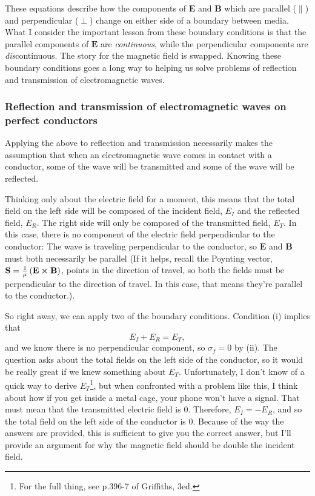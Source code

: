 \documentclass[11pt]{paper}
\begin{document}
These equations describe how the components of $\mathbf{E}$ and $\mathbf{B}$ which are parallel ($\parallel$) and perpendicular ($\perp$) change on either side of a boundary between media.  What I consider the important lesson from these boundary conditions is that the parallel components of $\mathbf{E}$ are \emph{continuous}, while the perpendicular components are \emph{dis}continuous.  The story for the magnetic field is swapped.  Knowing these boundary conditions goes a long way to helping us solve problems of reflection and transmission of electromagnetic waves.

\subsubsection*{Reflection and transmission of electromagnetic waves on perfect conductors}
Applying the above to reflection and transmission necessarily makes the assumption that when an electromagnetic wave comes in contact with a conductor, some of the wave will be transmitted and some of the wave will be reflected.

Thinking only about the electric field for a moment, this means that the total field on the left side will be composed of the incident field, $E_I$ and the reflected field, $E_R$.  The right side will only be composed of the transmitted field, $E_T$.  In this case, there is no component of the electric field perpendicular to the conductor:  The wave is traveling perpendicular to the conductor, so $\mathbf{E}$ and $\mathbf{B}$ must both necessarily be parallel (If it helps, recall the Poynting vector, $\mathbf{S} = \frac{1}{\mu}\left(\mathbf{E} \cross \mathbf{B}\right)$, points in the direction of travel, so both the fields must be perpendicular to the direction of travel.  In this case, that means they're parallel to the conductor.).

So right away, we can apply two of the boundary conditions.  Condition (i) implies that
\begin{equation}
E_I + E_R = E_T,
\end{equation}
and we know there is no perpendicular component, so $\sigma_f = 0$ by (ii).  The question asks about the total fields on the left side of the conductor, so it would be really great if we knew something about $E_T$.  Unfortunately, I don't know of a quick way to derive $E_T$\footnote{For the full thing, see p.396-7 of Griffiths, 3ed.}, but when confronted with a problem like this, I think about how if you get inside a metal cage, your phone won't have a signal.  That must mean that the transmitted electric field is 0.  Therefore, $E_I = -E_R$, and so the total field on the left side of the conductor is 0.  Because of the way the answers are provided, this is sufficient to give you the correct answer, but I'll provide an argument for why the magnetic field should be double the incident field.
\end{document}
